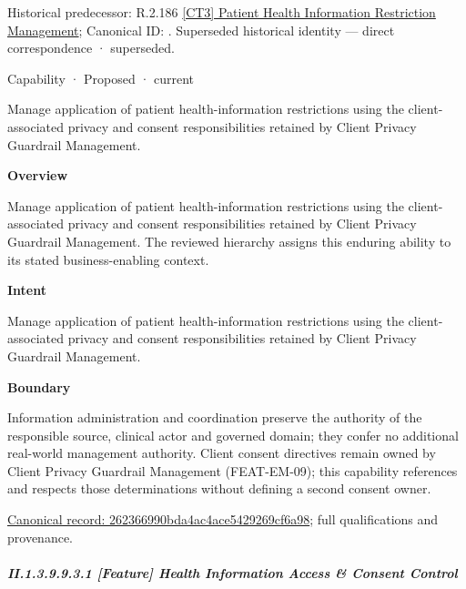 {\small Historical predecessor: R.2.186 \hyperref[element:5ad91d045474435a96b560e66ff7de05]{[CT3] Patient Health Information Restriction Management}; Canonical ID: \texttt{}. Superseded historical identity — direct correspondence · superseded.}\par
\label{element:262366990bda4ac4ace5429269cf6a98}
{\small Capability · Proposed · current}\par

Manage application of patient health-information restrictions using the client-associated privacy and consent responsibilities retained by Client Privacy Guardrail Management.



\textbf{Overview}



Manage application of patient health-information restrictions using the client-associated privacy and consent responsibilities retained by Client Privacy Guardrail Management. The reviewed hierarchy assigns this enduring ability to its stated business-enabling context.



\textbf{Intent}



Manage application of patient health-information restrictions using the client-associated privacy and consent responsibilities retained by Client Privacy Guardrail Management.



\textbf{Boundary}



Information administration and coordination preserve the authority of the responsible source, clinical actor and governed domain; they confer no additional real-world management authority. Client consent directives remain owned by Client Privacy Guardrail Management (FEAT-EM-09); this capability references and respects those determinations without defining a second consent owner.


{\footnotesize \href{../../../../continuum/strategy/capability/262366990bda4ac4ace5429269cf6a98.md}{Canonical record: 262366990bda4ac4ace5429269cf6a98}; full qualifications and provenance.}\par
\subparagraph*{II.1.3.9.9.3.1 [Feature] Health Information Access \& Consent Control}
\label{navigation:II.1.3.9.9.3.1}

